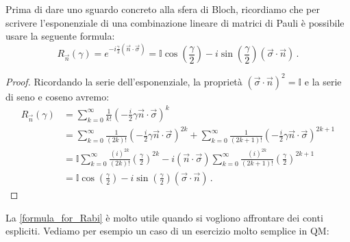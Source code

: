 \noindent Prima di dare uno sguardo concreto alla sfera di Bloch, ricordiamo che per scrivere l'esponenziale di una combinazione lineare di matrici di Pauli è possibile usare la seguente formula:
\begin{equation}\label{formula_for_Rabi}
    R_{\vec{n}}(\gamma) = e^{-i \frac{\gamma}{2} (\vec n \cdot \vec \sigma)} = \mathbb{I} \cos \! \left( \frac{\gamma}{2} \right) - i \sin \! \left( \frac{\gamma}{2} \right) \left( \vec \sigma \cdot \vec n \right) \, .
\end{equation}

\begin{proof}
    Ricordando la serie dell'esponenziale, la proprietà $(\vec \sigma \cdot \vec n)^2 = \mathbb{I}$ e la serie di seno e coseno avremo:
    \begin{align*}
        R_{\vec{n}}(\gamma) &= \sum_{k=0}^\infty \frac{1}{k!} \left( -\frac{i}{2} \gamma \vec n \cdot \vec \sigma \right)^k \\
        &= \sum_{k=0}^\infty \frac{1}{(2k)!} \left( -\frac{i}{2} \gamma \vec n \cdot \vec \sigma \right)^{2k} + \sum_{k=0}^\infty \frac{1}{(2k + 1)!} \left( -\frac{i}{2} \gamma \vec n \cdot \vec \sigma \right)^{2k+1} \\
        &= \mathbb{I} \sum_{k=0}^\infty \frac{(i)^{2k}}{(2k)!} \left( \frac{\gamma}{2} \right)^{2k} -i (\vec n \cdot \vec \sigma) \sum_{k=0}^\infty \frac{(i)^{2k}}{(2k+1)!} \left( \frac{\gamma}{2} \right)^{2k+1} \\
        &= \mathbb{I} \cos \! \left( \frac{\gamma}{2} \right) - i \sin \! \left( \frac{\gamma}{2} \right) \left( \vec \sigma \cdot \vec n \right) \, .
    \end{align*}
\end{proof}

\noindent La \eqref{formula_for_Rabi} è molto utile quando si vogliono affrontare dei conti espliciti. Vediamo per esempio un caso di un esercizio molto semplice in QM:

